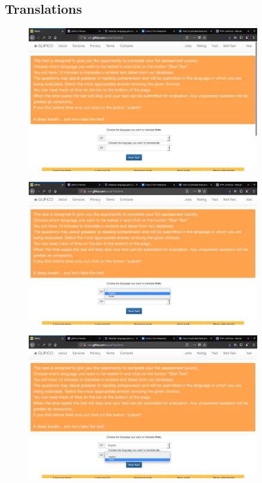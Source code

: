 \documentclass[11 pt, a4paper]{article}
\begin{document}
\clearpage
\subsection{Translations}

\begin{figure}[H]
\centering
\includegraphics[width=0.9\textwidth]{translator_socialtrad0.png}
\end{figure}


\begin{figure}[H]
\centering
\includegraphics[width=0.9\textwidth]{translator_socialtrad1.png}
\end{figure}


\clearpage
\begin{figure}[H]
\centering
\includegraphics[width=0.9\textwidth]{translator_socialtrad2.png}
\end{figure}
\end{document}
